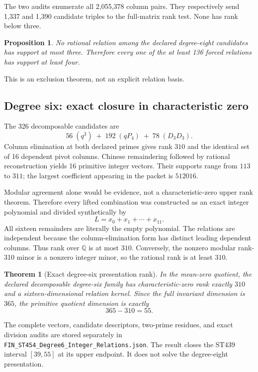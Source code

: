 \documentclass[11pt,a4paper]{article}
\newtheorem{theorem}{Theorem}
\newtheorem{proposition}{Proposition}
\begin{document}
The two audits enumerate all 2,055,378 column pairs.  They respectively send
1,337 and 1,390 candidate triples to the full-matrix rank test.  None has rank
below three.

\begin{proposition}
No rational relation among the declared degree-eight candidates has support
at most three.  Therefore every one of the at least 136 forced relations has
support at least four.
\end{proposition}

This is an exclusion theorem, not an explicit relation basis.

\subsection{Degree six: exact closure in characteristic zero}

The 326 decomposable candidates are
\[
 56\;(q^3)\; +\;192\;(qP_4)\; +\;78\;(D_3D_3).
\]
Column elimination at both declared primes gives rank $310$ and the identical
set of 16 dependent pivot columns.  Chinese remaindering followed by rational
reconstruction yields 16 primitive integer vectors.  Their supports range
from $113$ to $311$; the largest coefficient appearing in the packet is
$512016$.

Modular agreement alone would be evidence, not a characteristic-zero upper
rank theorem.  Therefore every lifted combination was constructed as an exact
integer polynomial and divided synthetically by
\[
 L=x_0+x_1+\cdots+x_{11}.
\]
All sixteen remainders are literally the empty polynomial.  The relations are
independent because the column-elimination form has distinct leading
dependent columns.  Thus rank over $\mathbb Q$ is at most $310$.  Conversely,
the nonzero modular rank-310 minor is a nonzero integer minor, so the rational
rank is at least $310$.

\begin{theorem}[Exact degree-six presentation rank]
In the mean-zero quotient, the declared decomposable degree-six family has
characteristic-zero rank exactly $310$ and a sixteen-dimensional relation
kernel.  Since the full invariant dimension is $365$, the primitive quotient
dimension is exactly
\[
 365-310=55.
\]
\end{theorem}

The complete vectors, candidate descriptors, two-prime residues, and exact
division audits are stored separately in
\texttt{FIN\_ST454\_Degree6\_Integer\_Relations.json}.  The result closes the
ST439 interval $[39,55]$ at its upper endpoint.  It does not solve the
degree-eight presentation.
\end{document}
